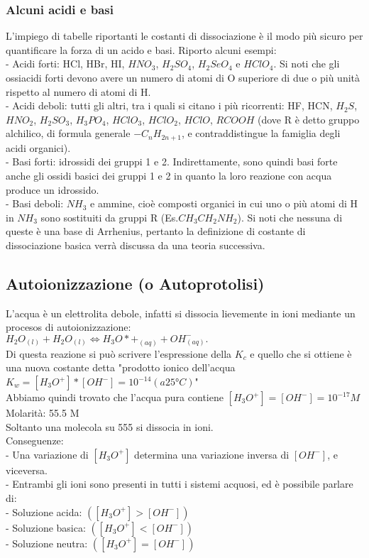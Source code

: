 \subsubsection{Alcuni acidi e basi}
L'impiego di tabelle riportanti le costanti di dissociazione è il modo più sicuro per quantificare la forza di un acido e basi. Riporto alcuni esempi:\\
\tab- Acidi forti: HCl, HBr, HI, $HNO_3$, $H_2SO_4$, $H_2SeO_4$ e $HClO_4$. Si noti che gli ossiacidi forti devono avere un numero di atomi di O superiore di due o più unità rispetto al numero di atomi di H.\\
\tab- Acidi deboli: tutti gli altri, tra i quali si citano i più ricorrenti: HF, HCN, $H_2S$, $HNO_2$, $H_2SO_3$, $H_3PO_4$, $HClO_3$, $HClO_2$, $HClO$, $RCOOH$ (dove R è detto gruppo alchilico, di formula generale $-C_nH_{2n+1}$, e contraddistingue la famiglia degli acidi organici).\\
\tab- Basi forti: idrossidi dei gruppi 1 e 2. Indirettamente, sono quindi basi forte anche gli ossidi basici dei gruppi 1 e 2 in quanto la loro reazione con acqua produce un idrossido.\\
\tab- Basi deboli: $NH_3$ e ammine, cioè composti organici in cui uno o più atomi di H in $NH_3$ sono sostituiti da gruppi R (Es.$CH_3CH_2NH_2$). Si noti che nessuna di queste è una base di Arrhenius, pertanto la definizione di costante di dissociazione basica verrà discussa da una teoria successiva.\
\subsection{Autoionizzazione (o Autoprotolisi)}
L'acqua è un elettrolita debole, infatti si dissocia lievemente in ioni mediante un procesos di autoionizzazione:\\
$H_2O_{(l)} + H_2O_{(l)} \Leftrightarrow H_3O*+_{(aq)}+ OH^-_{(aq)}.$\\
Di questa reazione si può scrivere l'espressione della $K_c$ e quello che si ottiene è una nuova costante detta "prodotto ionico dell'acqua $K_w = \left[H_3O^+\right] * [OH^-] = 10^{-14} (a 25°C)$"\\
Abbiamo quindi trovato che l'acqua pura contiene $\left[H_3O^+\right] = \left[OH^-\right] = 10^{-17} M$\\
Molarità: 55.5 M\\
Soltanto una molecola su 555 si dissocia in ioni.\\
Conseguenze:\\
\tab- Una variazione di $\left[H_3O^+\right]$ determina una variazione inversa di $\left[OH^-\right]$, e viceversa.\\
\tab- Entrambi gli ioni sono presenti in tutti i sistemi acquosi, ed è possibile parlare di:\\
\tab\tab- Soluzione acida: $\left(\left[H_3O^+\right] > \left[OH^-\right]\right)$\\
\tab\tab- Soluzione basica: $\left(\left[H_3O^+\right] < \left[OH^-\right]\right)$\\
\tab\tab- Soluzione neutra: $\left(\left[H_3O^+\right] = \left[OH^-\right]\right)$
